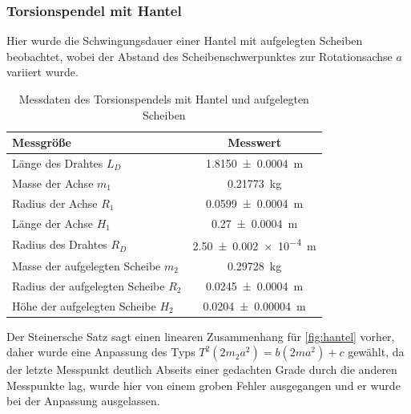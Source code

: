 










\subsubsection*{Torsionspendel mit Hantel}
Hier wurde die Schwingungsdauer einer Hantel mit aufgelegten Scheiben beobachtet, wobei der Abstand des Scheibenschwerpunktes zur Rotationsachse $a$ variiert wurde. 



\begin{table}[h]
	\centering	
	\caption{Messdaten des Torsionspendels mit Hantel und aufgelegten Scheiben  }
	\begin{tabular}{|l|c|} 
		\hline 
		Messgröße	& Messwert  \\ 
		\hline 
		Länge des Drahtes $L_D$& \SI{1.8150\pm 0.0004 } {m} \\ 
		\hline 
		Masse der Achse $m_1$& \SI{0.21773}{kg} \\ 
		\hline 
		Radius der Achse $R_1$ & \SI{0.0599 \pm 0.0004}{m}  \\ 
		\hline 
		Länge der Achse $H_1$ &	\SI{0.27\pm 0.0004}	{\metre}	\\
		\hline
		Radius des Drahtes $R_D$ & \SI{2.50+-0.002 e-4} {m} \\ 
		\hline 
		Masse der aufgelegten Scheibe $m_2$& \SI{0.29728}{kg} \\ 
		\hline 
		Radius der aufgelegten Scheibe $R_2$ & \SI{0.0245 \pm 0.0004}{m}  \\ 
		\hline 
		Höhe der aufgelegten Scheibe $H_2$ &\SI{0.0204\pm0.00004 }{\metre}			\\
		\hline
	
	\end{tabular} 
	
	\label{tab:dataTH}
\end{table} 

Der Steinersche Satz sagt einen linearen Zusammenhang für \cref{fig:hantel} vorher, daher wurde eine Anpassung des Typs $T^2(2m_2 a^2)=b (2m a^2)+c$ gewählt, da der letzte Messpunkt deutlich Abseits einer gedachten Grade durch die anderen Messpunkte lag, wurde hier von einem groben Fehler ausgegangen und er wurde bei der Anpassung ausgelassen.


